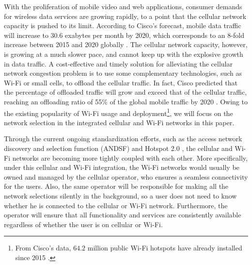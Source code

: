 \documentclass[journal]{IEEEtran}
\begin{document}
 With the proliferation of mobile video and web applications, consumer demands for wireless data services are growing rapidly, to a point that the cellular network capacity is pushed to its limit.
  According to Cisco's forecast, mobile data traffic will increase to $30.6$ exabytes per month by 2020, which corresponds to an $8$-fold increase between 2015 and 2020 globally \cite{cisco_cv16}. The cellular network capacity, however, is growing at a much slower pace, and cannot keep up with the explosive growth in data traffic.
	A cost-effective and timely solution for alleviating the cellular network congestion problem is to use some complementary technologies, such as Wi-Fi or small cells, to offload the cellular traffic. 
	In fact, Cisco predicted that the percentage of offloaded traffic will grow and exceed that of the cellular traffic, reaching an offloading ratio of 55\% of the global mobile traffic  by 2020 \cite{cisco_cv16}.	
  Owing to the existing popularity of Wi-Fi usage and deployment\footnote{From Cisco's data, $64.2$ million public Wi-Fi hotspots have already installed since 2015 \cite{cisco_cv16}.}, we will focus on the network selection in the integrated cellular and Wi-Fi networks in this paper.
	

  Through the current ongoing standardization efforts, such as the access network discovery and selection function (ANDSF) and Hotspot 2.0 \cite{lucent_wr12, 4gamericas_io13}, the cellular and Wi-Fi networks are becoming more tightly coupled with each other. More specifically, under this cellular and Wi-Fi integration, the Wi-Fi networks would usually be owned and managed by the cellular operator, who ensures a seamless connectivity for the users. Also, the same operator will be responsible for making all the network selections silently in the background, so a user does not need to know whether he is connected to the cellular or Wi-Fi network. Furthermore, the operator will ensure that all functionality and services are consistently available regardless of whether the user is on cellular or Wi-Fi. %
\end{document}

